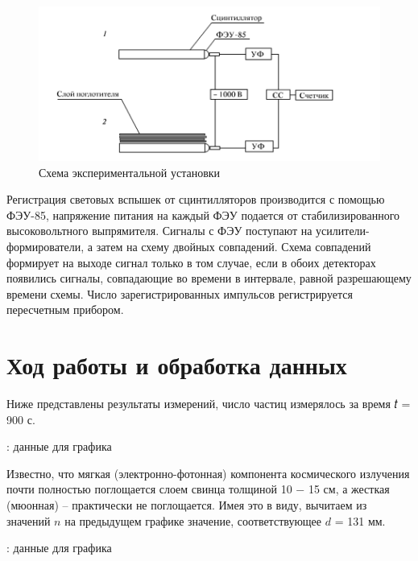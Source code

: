 \documentclass[15pt,a5paper,reqno]{article}
\begin{document}
\begin{figure}[h]
    \centering
    \includegraphics[width=1.0\linewidth]{pics/scheme.png}
    \caption{Схема экспериментальной установки}
    \label{scheme}
\end{figure}


Регистрация световых вспышек от сцинтилляторов производится с помощью ФЭУ-85,
напряжение питания на каждый ФЭУ подается от стабилизированного высоковольтного
выпрямителя. Сигналы с ФЭУ поступают на усилители-формирователи, а затем на схему
двойных совпадений. Схема совпадений формирует на выходе сигнал только в том
случае, если в обоих детекторах появились сигналы, совпадающие во времени в
интервале, равной разрешающему времени схемы. Число зарегистрированных импульсов
регистрируется пересчетным прибором.

\section{Ход работы и обработка данных}

Ниже представлены результаты измерений, число частиц измерялось за время 𝑡 = 900 с.


\begin{table}[h!]
    \centering
    
    \caption{: данные для графика}
\label{tb1}
\end{table}

Известно, что мягкая (электронно-фотонная) компонента космического излучения почти
полностью поглощается слоем свинца толщиной 10 − 15 см, а жесткая (мюонная) –
практически не поглощается. Имея это в виду, вычитаем из значений $n$ на предыдущем
графике значение, соответствующее $d$ = 131 мм.

\begin{table}[h!]
    \centering
    
    \caption{: данные для графика}
    \label{tb2}
\end{table}
\end{document}

